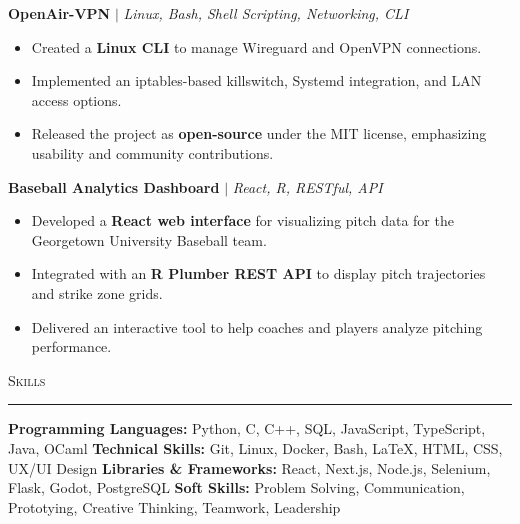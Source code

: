 \documentclass[11pt,letterpaper]{article}
\begin{document}
\begin{list}{}{\setlength{\leftmargin}{1em}\setlength{\rightmargin}{2pt}}
    \item
        \small{\textbf{OpenAir-VPN}} $|$ \small{\textit{Linux, Bash, Shell Scripting, Networking, CLI}} \hfill \small{\textit{}}
          \begin{itemize}[itemsep=-5pt, topsep=-2pt]
              \item Created a \textbf{Linux CLI} to manage Wireguard and OpenVPN connections.
              \item Implemented an iptables-based killswitch, Systemd integration, and LAN access options.
              \item Released the project as \textbf{open-source} under the MIT license, emphasizing usability and community contributions.
          \end{itemize}
          \vspace{4pt}
    
    \item
          \textbf{Baseball Analytics Dashboard} $|$ \small{\textit{React, R, RESTful, API}} \hfill \small{\textit{}}
          \begin{itemize}[itemsep=-5pt, topsep=-2pt]
              \item Developed a \textbf{React web interface} for visualizing pitch data for the Georgetown University Baseball team.
              \item Integrated with an \textbf{R Plumber REST API} to display pitch trajectories and strike zone grids.
              \item Delivered an interactive tool to help coaches and players analyze pitching performance.
          \end{itemize}
\end{list}



\vspace{4pt}
\textsc{\large{Skills}} 
\vspace{4pt}
\hrule
\begin{list}{}{\setlength{\leftmargin}{1em}\setlength{\rightmargin}{2pt}}
  
    \item
          \small{\textbf{Programming Languages:} Python, C, C++, SQL, JavaScript, TypeScript, Java, OCaml}
          \vspace{2pt} \newline
          \small{\textbf{Technical Skills:} Git, Linux, Docker, Bash, LaTeX, HTML, CSS, UX/UI Design}
          \vspace{2pt} \newline
          \small{\textbf{Libraries \& Frameworks:} React, Next.js, Node.js, Selenium, Flask, Godot, PostgreSQL}
          \vspace{2pt} \newline
          \small{\textbf{Soft Skills:} Problem Solving, Communication, Prototying, Creative Thinking, Teamwork, Leadership}
          \vspace{0pt}
\end{list}
\end{document}
